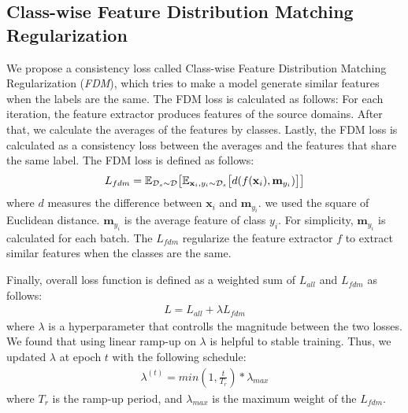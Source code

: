 \subsection{Class-wise Feature Distribution Matching Regularization}
We propose a consistency loss called Class-wise Feature Distribution Matching Regularization (\textit{FDM}), which tries to make a model generate similar features when the labels are the same. The FDM loss is calculated as follows: For each iteration, the feature extractor produces features of the source domains. After that, we calculate the averages of the features by classes. Lastly, the FDM loss is calculated as a consistency loss between the averages and the features that share the same label. The FDM loss is defined as follows:
\begin{equation}
\label{eq:fdm}
\begin{aligned}
L_{fdm} = \mathbb{E}_{\mathcal{D}_s\sim\mathcal{D}} \big[ \mathbb{E}_{\mathbf{x}_i,y_i\sim \mathcal{D}_s} \big[  d(f(\mathbf{x}_i), \mathbf{m}_{y_i}) \big] \big]
\end{aligned}
\end{equation}
where $d$ measures the difference between $\mathbf{x}_i$ and $\mathbf{m}_{y_i}$. we used the square of Euclidean distance. $\mathbf{m}_{y_i}$ is the average feature of class $y_i$. For simplicity, $\mathbf{m}_{y_i}$ is calculated for each batch. The $L_{fdm}$ regularize the feature extractor $f$ to extract similar features when the classes are the same.

Finally, overall loss function is defined as a weighted sum of $L_{all}$ and $L_{fdm}$ as follows:
\begin{equation}
\label{eq:overall}
\begin{aligned}
L = L_{all} + \lambda L_{fdm}
\end{aligned}
\end{equation}
where $\lambda$ is a hyperparameter that controlls the magnitude between the two losses. We found that using linear ramp-up on $\lambda$ is helpful to stable training. Thus, we updated $\lambda$ at epoch $t$ with the following schedule:
\begin{equation}
\label{eq:rampup}
\begin{aligned}
\lambda^{(t)} = min(1, \frac{t}{T_r}) * \lambda_{max}
\end{aligned}
\end{equation}
where $T_r$ is the ramp-up period, and $\lambda_{max}$ is the maximum weight of the $L_{fdm}$.

